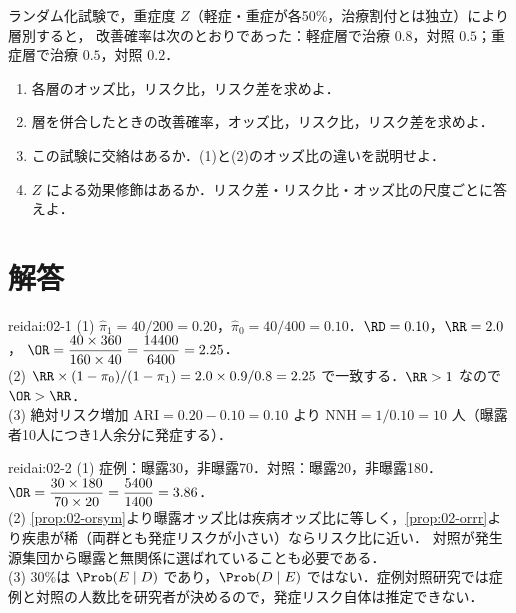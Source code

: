 \begin{reidai}[オッズ比の非可縮性]\label{reidai:02-3}
ランダム化試験で，重症度 $Z$（軽症・重症が各50\%，治療割付とは独立）により層別すると，
改善確率は次のとおりであった：軽症層で治療 $0.8$，対照 $0.5$；重症層で治療 $0.5$，対照 $0.2$．
\begin{enumerate}[label=(\arabic*)]
\item 各層のオッズ比，リスク比，リスク差を求めよ．
\item 層を併合したときの改善確率，オッズ比，リスク比，リスク差を求めよ．
\item この試験に交絡はあるか．(1)と(2)のオッズ比の違いを説明せよ．
\item $Z$ による効果修飾はあるか．リスク差・リスク比・オッズ比の尺度ごとに答えよ．
\end{enumerate}
\end{reidai}

\section{解答}\label{sec:02-sol}
\begin{kaitou}{reidai:02-1}
(1) $\hat\pi_1=40/200=0.20$，$\hat\pi_0=40/400=0.10$．$\RD=0.10$，$\RR=2.0$，
$\OR=\dfrac{40\times360}{160\times40}=\dfrac{14400}{6400}=2.25$．\\
(2) $\RR\times(1-\pi_0)/(1-\pi_1)=2.0\times0.9/0.8=2.25$ で一致する．$\RR>1$ なので $\OR>\RR$．\\
(3) 絶対リスク増加 $\mathrm{ARI}=0.20-0.10=0.10$ より $\mathrm{NNH}=1/0.10=10$ 人（曝露者10人につき1人余分に発症する）．
\end{kaitou}

\begin{kaitou}{reidai:02-2}
(1) 症例：曝露30，非曝露70．対照：曝露20，非曝露180．$\OR=\dfrac{30\times180}{70\times20}=\dfrac{5400}{1400}=3.86$．\\
(2) \cref{prop:02-orsym}より曝露オッズ比は疾病オッズ比に等しく，\cref{prop:02-orrr}より疾患が稀（両群とも発症リスクが小さい）ならリスク比に近い．
対照が発生源集団から曝露と無関係に選ばれていることも必要である．\\
(3) 30\%は $\Prob(E\mid D)$ であり，$\Prob(D\mid E)$ ではない．症例対照研究では症例と対照の人数比を研究者が決めるので，発症リスク自体は推定できない．
\end{kaitou}

